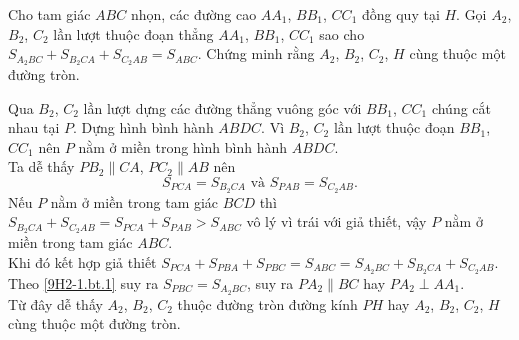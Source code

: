 \begin{bt}
 Cho tam giác $ABC$ nhọn, các đường cao $AA_1$, $BB_1$, $CC_1$ đồng quy tại $H$. Gọi $A_2$, $B_2$, $C_2$ lần lượt thuộc đoạn thẳng $AA_1$, $BB_1$, $CC_1$ sao cho $S_{A_2BC}+S_{B_2CA}+S_{C_2AB}=S_{ABC}$. Chứng minh rằng $A_2$, $B_2$, $C_2$, $H$ cùng thuộc một đường tròn.
 \loigiai
  {
  \begin{center}
  \end{center}
  Qua $B_2$, $C_2$ lần lượt dựng các đường thẳng vuông góc với $BB_1$, $CC_1$ chúng cắt nhau tại $P$. Dựng hình bình hành $ABDC$. Vì $B_2$, $C_2$ lần lượt thuộc đoạn $BB_1$, $CC_1$ nên $P$ nằm ở miền trong hình bình hành $ABDC$.\\
  Ta dễ thấy $PB_2 \parallel CA$, $PC_2 \parallel AB$ nên 
  \begin{equation}\label{9H2-1.bt.1}
   S_{PCA}= S_{B_2CA} \text{ và } S_{PAB}=S_{C_2AB}.
  \end{equation}
  Nếu $P$ nằm ở miền trong tam giác $BCD$ thì $S_{B_2CA}+S_{C_2AB}= S_{PCA}+S_{PAB} > S_{ABC}$ vô lý vì trái với giả thiết, vậy $P$ nằm ở miền trong tam giác $ABC$.\\
  Khi đó kết hợp giả thiết $S_{PCA}+S_{PBA}+S_{PBC}=S_{ABC}=S_{A_2BC}+S_{B_2CA}+S_{C_2AB}$. Theo \eqref{9H2-1.bt.1} suy ra $S_{PBC}=S_{A_2BC}$, suy ra $PA_2 \parallel BC$ hay $PA_2 \perp AA_1$.\\
  Từ đây dễ thấy $A_2$, $B_2$, $C_2$ thuộc đường tròn đường kính $PH$ hay $A_2$, $B_2$, $C_2$, $H$ cùng thuộc một đường tròn.
  }
\end{bt}


